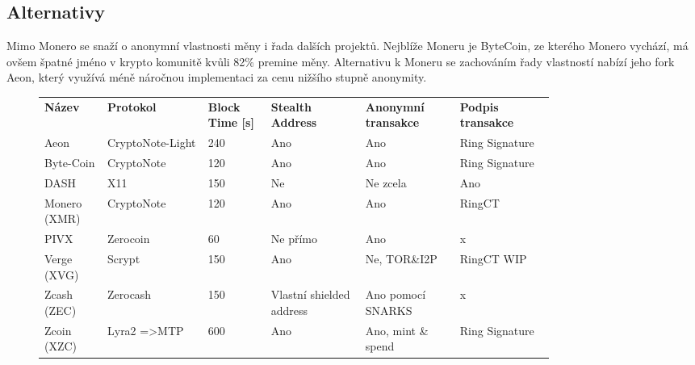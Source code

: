 \documentclass[
  printed, %
  table,   %
  nolof,     %
  nolot,     %
           oneside, color
]{fithesis3}
\begin{document}

\newpage
\subsection{Alternativy}
Mimo Monero se snaží o anonymní vlastnosti měny i řada dalších projektů. Nejblíže Moneru je ByteCoin, ze kterého Monero vychází, má ovšem špatné jméno v krypto komunitě kvůli 82\% premine měny. Alternativu k Moneru se zachováním řady vlastností nabízí jeho fork Aeon, který využívá méně náročnou implementaci za cenu nižšího stupně anonymity.
\begin{figure}[H]
\centering
\begin{tabular}{p{0.1\linewidth}p{0.16\linewidth}p{0.1\linewidth}p{0.15\linewidth}p{0.15\linewidth}p{0.15\linewidth}}
\textbf{Název}        & \textbf{Protokol}                & \textbf{Block Time {[}s{]}} & \textbf{Stealth Address    }      & \textbf{Anonymní transakce} & \textbf{Podpis transakce}  \\
Aeon         & CryptoNote-Light        & 240                & Ano                      & Ano                & Ring Signature \\
Byte-Coin     & CryptoNote              & 120                & Ano                      & Ano                & Ring Signature \\
DASH         & X11                     & 150                & Ne                       & Ne zcela           & Ano            \\
Monero (XMR) & CryptoNote              & 120                & Ano                      & Ano                & RingCT         \\
PIVX         & Zerocoin                & 60                 & Ne přímo                 & Ano                & x              \\
Verge (XVG)  & Scrypt                  & 150                & Ano                      & Ne, TOR\&I2P       & RingCT WIP     \\
Zcash (ZEC)  & Zerocash                & 150                & Vlastní shielded address & Ano pomocí SNARKS    & x              \\
Zcoin (XZC)  & Lyra2 =\textgreater MTP & 600                & Ano                      & Ano, mint \& spend   & Ring Signature

\end{tabular}
\label{table:monero-alternatives}

\end{figure}
\end{document}
